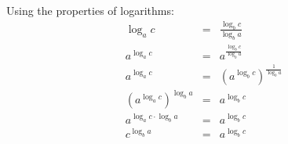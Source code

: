 Using the properties of logarithms:
\begin{eqnarray*}
	\log_a c & = & \frac{\log_b c}{\log_b a} \\
	a^{\log_a c} & = & a^{\frac{\log_b c}{\log_b a}} \\
	a^{\log_a c} & = & \left( a^{\log_b c} \right)^{\frac{1}{\log_b a}} \\
	\left( a^{\log_a c} \right)^{\log_b a} & = & a^{\log_b c} \\
	a^{\log_a c \cdot \log_b a} & = & a^{\log_b c} \\
	c^{\log_b a} & = & a^{\log_b c}
\end{eqnarray*}
